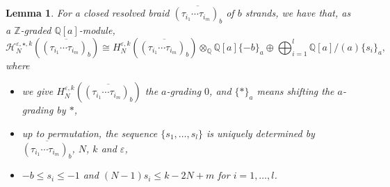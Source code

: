 \documentclass{amsart}
\theoremstyle{plain}
\newtheorem{lemma}[theorem]{Lemma}
\theoremstyle{definition}
\theoremstyle{remark}
\numberwithin{equation}{section}
\begin{document}
\begin{lemma}\label{lemma-module-homology-resolved-braid}
For a closed resolved braid $\overline{(\tau_{i_1}\cdots\tau_{i_m})_b}$ of $b$ strands, we have that, as a ${\mathbb{Z}}$-graded ${\mathbb{Q}}[a]$-module,
\[
{\mathcal{H}}_N^{{\varepsilon},\star,k}(\overline{(\tau_{i_1}\cdots\tau_{i_m})_b}) \cong H_N^{{\varepsilon},k}(\overline{(\tau_{i_1}\cdots\tau_{i_m})_b}) \otimes_{\mathbb{Q}} {\mathbb{Q}}[a]\{-b\}_a \oplus \bigoplus_{i=1}^l {\mathbb{Q}}[a]/(a) \{s_i\}_a,
\]
where
\begin{itemize}
	\item we give $H_N^{{\varepsilon},k}(\overline{(\tau_{i_1}\cdots\tau_{i_m})_b})$ the $a$-grading $0$, and $\{\ast\}_a$ means shifting the $a$-grading by $\ast$,
	\item up to permutation, the sequence $\{s_1,\dots,s_l\}$ is uniquely determined by $\overline{(\tau_{i_1}\cdots\tau_{i_m})_b}$, $N$, $k$ and ${\varepsilon}$,
	\item $-b \leq s_i \leq -1$ and $(N-1)s_i \leq k -2N+m$ for $i=1,\dots,l$.
\end{itemize}
\end{lemma}
\end{document}
